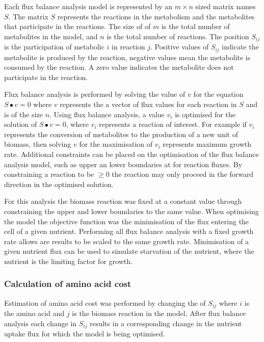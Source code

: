 Each flux balance analysis model is represented by an $m \times n$ sized matrix names $S$. The matrix $S$ represents the reactions in the metabolism and the metabolites that participate in the reactions. The size of of $m$ is the total number of metabolites in the model, and $n$ is the total number of reactions. The position $S_{ij}$ is the participation of metabolic $i$ in reaction $j$. Positive values of $S_{ij}$ indicate the metabolite is produced by the reaction, negative values mean the metabolite is consumed by the reaction. A zero value indicates the metabolite does not participate in the reaction.

Flux balance analysis is performed by solving the value of $v$ for the equation $S \bullet v = 0$ where $v$ represents the a vector of flux values for each reaction in $S$ and is of the size $n$. Using flux balance analysis, a value $v_{i}$ is optimised for the solution of $S \bullet v = 0$, where $v_{i}$ represents a reaction of interest. For example if $v_{i}$ represents the conversion of metabolites to the production of a new unit of biomass, then solving $v$ for the maximisation of $v_{i}$ represents maximum growth rate. Additional constraints can be placed on the optimisation of the flux balance analysis model, such as upper an lower boundaries at for reaction fluxes. By constraining a reaction to be $\geq 0$ the reaction may only proceed in the forward direction in the optimised solution.

For this analysis the biomass reaction was fixed at a constant value through constraining the upper and lower boundaries to the same value. When optimising the model the objective function was the minimisation of the flux entering the cell of a given nutrient. Performing all flux balance analysis with a fixed growth rate allows are results to be scaled to the same growth rate. Minimisation of a given nutrient flux can be used to simulate starvation of the nutrient, where the nutrient is the limiting factor for growth.

\subsubsection{Calculation of amino acid cost}

Estimation of amino acid cost was performed by changing the of $S_{ij}$ where $i$ is the amino acid and $j$ is the biomass reaction in the model. After flux balance analysis each change in $S_{ij}$ results in a corresponding change in the nutrient uptake flux for which the model is being optimised.
